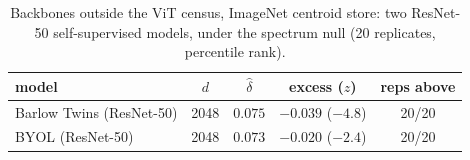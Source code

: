 \begin{table}[H]
\centering
\small
\begin{tabular}{lcccc}
\toprule
model & $d$ & $\hat\delta$ & excess ($z$) & reps above \\
\midrule
Barlow Twins (ResNet-50) & 2048 & $0.075$ & $-0.039$ ($-4.8$) & 20/20 \\
BYOL (ResNet-50) & 2048 & $0.073$ & $-0.020$ ($-2.4$) & 20/20 \\
\bottomrule
\end{tabular}
\caption{Backbones outside the ViT census, ImageNet centroid store: two ResNet-50 self-supervised models, under the spectrum null (20 replicates, percentile rank).}
\label{tab:b24-extra}
\end{table}
